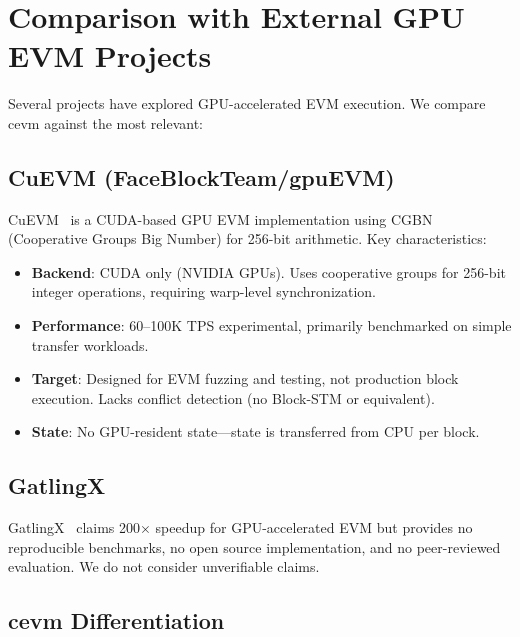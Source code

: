 \section{Comparison with External GPU EVM Projects}

\label{sec:comparison}

Several projects have explored GPU-accelerated EVM execution. We compare cevm against
the most relevant:

\subsection{CuEVM (FaceBlockTeam/gpuEVM)}

CuEVM~\cite{cuevm} is a CUDA-based GPU EVM implementation using CGBN (Cooperative Groups
Big Number) for 256-bit arithmetic. Key characteristics:

\begin{itemize}
\item \textbf{Backend}: CUDA only (NVIDIA GPUs). Uses cooperative groups for 256-bit
      integer operations, requiring warp-level synchronization.
\item \textbf{Performance}: 60--100K TPS experimental, primarily benchmarked on simple
      transfer workloads.
\item \textbf{Target}: Designed for EVM fuzzing and testing, not production block execution.
      Lacks conflict detection (no Block-STM or equivalent).
\item \textbf{State}: No GPU-resident state---state is transferred from CPU per block.
\end{itemize}

\subsection{GatlingX}

GatlingX~\cite{gatlingx} claims 200$\times$ speedup for GPU-accelerated EVM but provides
no reproducible benchmarks, no open source implementation, and no peer-reviewed evaluation.
We do not consider unverifiable claims.

\subsection{cevm Differentiation}


